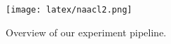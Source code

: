 \begin{figure}[htbp]
    \centering
    \texttt{[image: latex/naacl2.png]}
    \caption{Overview of our experiment pipeline.}
    \label{fig:overview}
\end{figure}
